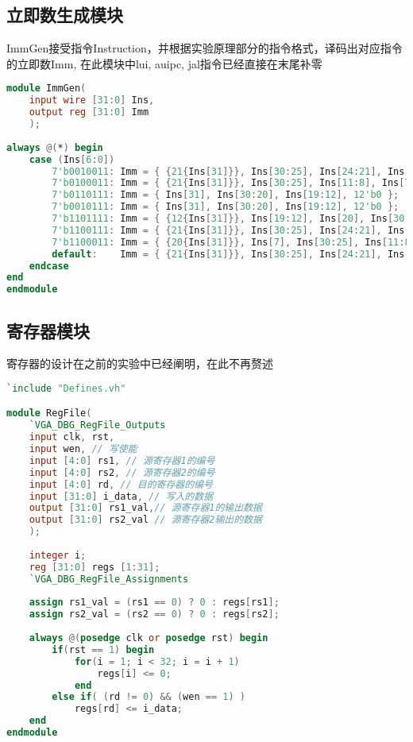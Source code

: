 \subsection{立即数生成模块}
ImmGen接受指令Instruction，并根据实验原理部分的指令格式，译码出对应指令的立即数Imm, 在此模块中lui, auipc, jal指令已经直接在末尾补零
\begin{lstlisting}[language = {verilog}]
module ImmGen(
    input wire [31:0] Ins,
    output reg [31:0] Imm
    );
    
always @(*) begin
    case (Ins[6:0])
        7'b0010011: Imm = { {21{Ins[31]}}, Ins[30:25], Ins[24:21], Ins[20] };    //arith_I type: addi, slti, sltiu, xori, ori, andi
        7'b0100011: Imm = { {21{Ins[31]}}, Ins[30:25], Ins[11:8], Ins[7] };      //store
        7'b0110111: Imm = { Ins[31], Ins[30:20], Ins[19:12], 12'b0 };            //lui
        7'b0010111: Imm = { Ins[31], Ins[30:20], Ins[19:12], 12'b0 };            //auipc
        7'b1101111: Imm = { {12{Ins[31]}}, Ins[19:12], Ins[20], Ins[30:25], Ins[24:21], 1'b0 }; //jal
        7'b1100111: Imm = { {21{Ins[31]}}, Ins[30:25], Ins[24:21], Ins[20] };    //jalr
        7'b1100011: Imm = { {20{Ins[31]}}, Ins[7], Ins[30:25], Ins[11:8], 1'b0}; //branch
        default: 	Imm = { {21{Ins[31]}}, Ins[30:25], Ins[24:21], Ins[20] };    // IMM_I
    endcase 
end
endmodule    
\end{lstlisting}

\subsection{寄存器模块}
寄存器的设计在之前的实验中已经阐明，在此不再赘述
\begin{lstlisting}[language = {verilog}]
`include "Defines.vh"

module RegFile(
    `VGA_DBG_RegFile_Outputs
    input clk, rst,
    input wen, // 写使能
    input [4:0] rs1, // 源寄存器1的编号
    input [4:0] rs2, // 源寄存器2的编号
    input [4:0] rd, // 目的寄存器的编号
    input [31:0] i_data, // 写入的数据
    output [31:0] rs1_val,// 源寄存器1的输出数据
    output [31:0] rs2_val // 源寄存器2输出的数据
    );
    
    integer i;
    reg [31:0] regs [1:31];
    `VGA_DBG_RegFile_Assignments
    
    assign rs1_val = (rs1 == 0) ? 0 : regs[rs1];
    assign rs2_val = (rs2 == 0) ? 0 : regs[rs2];
    
    always @(posedge clk or posedge rst) begin
        if(rst == 1) begin
            for(i = 1; i < 32; i = i + 1)
                regs[i] <= 0;
            end
        else if( (rd != 0) && (wen == 1) )
            regs[rd] <= i_data;
    end
endmodule
\end{lstlisting}

